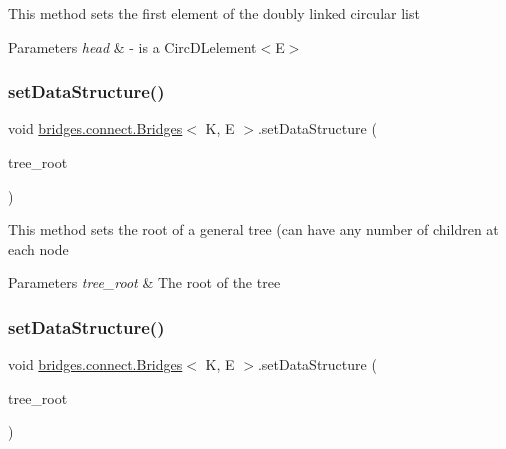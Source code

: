This method sets the first element of the doubly linked circular list


\begin{DoxyParams}{Parameters}
{\em head} & -\/ is a Circ\+D\+Lelement$<$\+E$>$ \\
\hline
\end{DoxyParams}
\hypertarget{classbridges_1_1connect_1_1_bridges_a0788905a16b9a8f3deb0b4a344f2b42d}{}\label{classbridges_1_1connect_1_1_bridges_a0788905a16b9a8f3deb0b4a344f2b42d} 
\subsubsection{\texorpdfstring{set\+Data\+Structure()}{setDataStructure()}\hspace{0.1cm}{\footnotesize\ttfamily [7/12]}}
{\footnotesize\ttfamily void \hyperlink{classbridges_1_1connect_1_1_bridges}{bridges.\+connect.\+Bridges}$<$ K, E $>$.set\+Data\+Structure (\begin{DoxyParamCaption}\item[{\hyperlink{classbridges_1_1base_1_1_tree_element}{Tree\+Element}$<$ E $>$}]{tree\+\_\+root }\end{DoxyParamCaption})}

This method sets the root of a general tree (can have any number of children at each node


\begin{DoxyParams}{Parameters}
{\em tree\+\_\+root} & The root of the tree \\
\hline
\end{DoxyParams}
\hypertarget{classbridges_1_1connect_1_1_bridges_a02a3d74b381473b5d97a8f8194df9b40}{}\label{classbridges_1_1connect_1_1_bridges_a02a3d74b381473b5d97a8f8194df9b40} 
\subsubsection{\texorpdfstring{set\+Data\+Structure()}{setDataStructure()}\hspace{0.1cm}{\footnotesize\ttfamily [8/12]}}
{\footnotesize\ttfamily void \hyperlink{classbridges_1_1connect_1_1_bridges}{bridges.\+connect.\+Bridges}$<$ K, E $>$.set\+Data\+Structure (\begin{DoxyParamCaption}\item[{\hyperlink{classbridges_1_1base_1_1_bin_tree_element}{Bin\+Tree\+Element}$<$ E $>$}]{tree\+\_\+root }\end{DoxyParamCaption})}

